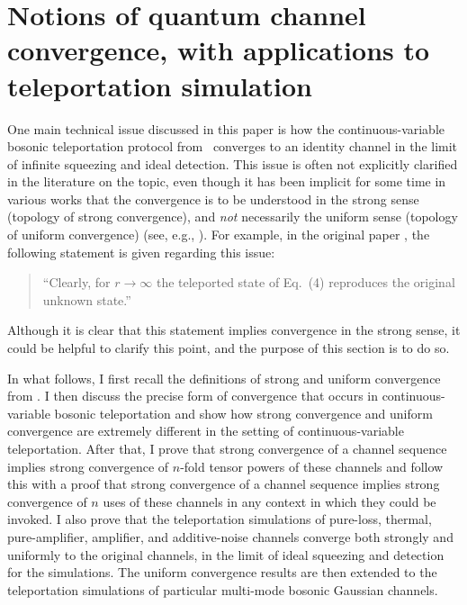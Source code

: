 \documentclass[apsrev,twocolumn]{revtex4-1}%
\begin{document}
\section{Notions of quantum channel convergence, with applications to
teleportation simulation}

One main technical issue discussed in this paper is how the
continuous-variable bosonic teleportation protocol from
\cite{prl1998braunstein}\ converges to an identity channel in the limit of
infinite squeezing and ideal detection. This issue is often not explicitly
clarified in the literature on the topic, even though it has been implicit for
some time in various works that the convergence is to be understood in the
strong sense (topology of strong convergence), and \textit{not} necessarily
the uniform sense (topology of uniform convergence) (see, e.g.,
\cite[Section~3]{SH08}). For example, in the original paper
\cite{prl1998braunstein}, the following statement is given regarding this issue:

\begin{quote}
\textquotedblleft Clearly, for $r\rightarrow\infty$ the teleported state of
Eq.~(4) reproduces the original unknown state.\textquotedblright
\end{quote}

\noindent Although it is clear that this statement implies convergence in the
strong sense, it could be helpful to clarify this point,
and the purpose of this section is to do so.

In what follows, I first recall the definitions of strong and uniform
convergence from \cite[Section~3]{SH08}. I then discuss the precise form of
convergence that occurs in continuous-variable bosonic teleportation and show
how strong convergence and uniform convergence are extremely different in the
setting of continuous-variable teleportation. After that, I prove that strong
convergence of a channel sequence implies strong convergence of $n$-fold
tensor powers of these channels and follow this with a proof that strong
convergence of a channel sequence implies strong convergence of $n$ uses of
these channels in any context in which they could be invoked. I also prove
that the teleportation simulations of pure-loss, thermal, pure-amplifier,
amplifier, and additive-noise channels converge both strongly and uniformly to
the original channels, in the limit of ideal squeezing and detection for the simulations. The uniform convergence results are then extended to the teleportation simulations of particular multi-mode bosonic Gaussian channels.
\end{document}
